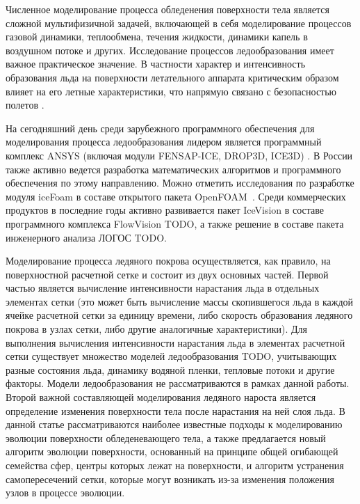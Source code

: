 Численное моделирование процесса обледенения поверхности тела является сложной мультифизичной задачей, включающей в себя моделирование процессов газовой динамики, теплообмена, течения жидкости, динамики капель в воздушном потоке и других.
Исследование процессов ледообразования имеет важное практическое значение.
В частности характер и интенсивность образования льда на поверхности летательного аппарата критическим образом влияет на его летные характеристики, что напрямую связано с безопасностью полетов \cite{Raj}.

На сегодняшний день среди зарубежного программного обеспечения для моделирования процесса ледообразования лидером является программный комплекс ANSYS (включая модули FENSAP-ICE, DROP3D, ICE3D) \cite{Martini}.
В России также активно ведется разработка математических алгоритмов и программного обеспечения по этому направлению.
Можно отметить исследования по разработке модуля iceFoam в составе открытого пакета OpenFOAM~\cite{Strijhak}.
Среди коммерческих продуктов в последние годы активно развивается пакет IceVision в составе программного комплекса FlowVision TODO, а также решение в составе пакета инженерного анализа ЛОГОС TODO.

Моделирование процесса ледяного покрова осуществляется, как правило, на поверхностной расчетной сетке и состоит из двух основных частей.
Первой частью является вычисление интенсивности нарастания льда в отдельных элементах сетки (это может быть вычисление массы скопившегося льда в каждой ячейке расчетной сетки за единицу времени, либо скорость образования ледяного покрова в узлах сетки, либо другие аналогичные характеристики).
Для выполнения вычисления интенсивности нарастания льда в элементах расчетной сетки существует множество моделей ледообразования TODO, учитывающих разные состояния льда, динамику водяной пленки, тепловые потоки и другие факторы.
Модели ледообразования не рассматриваются в рамках данной работы.
Второй важной составляющей моделирования ледяного нароста является определение изменения поверхности тела после нарастания на ней слоя льда.
В данной статье рассматриваются наиболее известные подходы к моделированию эволюции поверхности обледеневающего тела, а также предлагается новый алгоритм эволюции поверхности, основанный на принципе общей огибающей семейства сфер, центры которых лежат на поверхности, и алгоритм устранения самопересечений сетки, которые могут возникать из-за изменения положения узлов в процессе эволюции.
